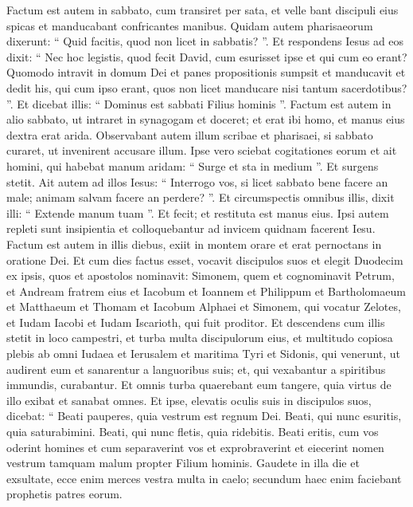 \begin{biblechapter}
\begin{biblechapter}
\begin{biblechapter}
\begin{biblechapter}
\begin{biblechapter}
\begin{biblechapter}
\verse Factum est autem in sabbato, cum transiret per sata, et velle bant discipuli eius spicas et manducabant confricantes manibus. 
\verse Quidam autem pharisaeorum dixerunt: “ Quid facitis, quod non licet in sabbatis? ”. 
\verse Et respondens Iesus ad eos dixit: “ Nec hoc legistis, quod fecit David, cum esurisset ipse et qui cum eo erant? 
\verse Quomodo intravit in domum Dei et panes propositionis sumpsit et manducavit et dedit his, qui cum ipso erant, quos non licet manducare nisi tantum sacerdotibus? ”. 
\verse Et dicebat illis: “ Dominus est sabbati Filius hominis ”.
 \verse Factum est autem in alio sabbato, ut intraret in synagogam et doceret; et erat ibi homo, et manus eius dextra erat arida. 
\verse Observabant autem illum scribae et pharisaei, si sabbato curaret, ut invenirent accusare illum. 
\verse Ipse vero sciebat cogitationes eorum et ait homini, qui habebat manum aridam: “ Surge et sta in medium ”. Et surgens stetit. 
\verse Ait autem ad illos Iesus: “ Interrogo vos, si licet sabbato bene facere an male; animam salvam facere an perdere? ”. 
 \verse Et circumspectis omnibus illis, dixit illi: “ Extende manum tuam ”. Et fecit; et restituta est manus eius. 
\verse Ipsi autem repleti sunt insipientia et colloquebantur ad invicem quidnam facerent Iesu.
 \verse Factum est autem in illis diebus, exiit in montem orare et erat pernoctans in oratione Dei. 
\verse Et cum dies factus esset, vocavit discipulos suos et elegit Duodecim ex ipsis, quos et apostolos nominavit: 
\verse Simonem, quem et cognominavit Petrum, et Andream fratrem eius et Iacobum et Ioannem et Philippum et Bartholomaeum 
\verse et Matthaeum et Thomam et Iacobum Alphaei et Simonem, qui vocatur Zelotes, 
\verse et Iudam Iacobi et Iudam Iscarioth, qui fuit proditor.
 \verse Et descendens cum illis stetit in loco campestri, et turba multa discipulorum eius, et multitudo copiosa plebis ab omni Iudaea et Ierusalem et maritima Tyri et Sidonis, 
\verse qui venerunt, ut audirent eum et sanarentur a languoribus suis; et, qui vexabantur a spiritibus immundis, curabantur. 
\verse Et omnis turba quaerebant eum tangere, quia virtus de illo exibat et sanabat omnes.
 \verse Et ipse, elevatis oculis suis in discipulos suos, dicebat:
 “ Beati pauperes, quia vestrum est regnum Dei.
 \verse Beati, qui nunc esuritis, quia saturabimini.
 Beati, qui nunc fletis, quia ridebitis.
 \verse Beati eritis, cum vos oderint homines et cum separaverint vos et exprobraverint et eiecerint nomen vestrum tamquam malum propter Filium hominis. 
 \verse Gaudete in illa die et exsultate, ecce enim merces vestra multa in caelo; secundum haec enim faciebant prophetis patres eorum.

\end{biblechapter}
\end{biblechapter}
\end{biblechapter}
\end{biblechapter}
\end{biblechapter}
\end{biblechapter}
